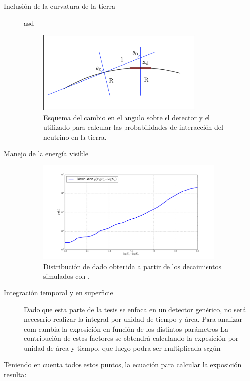 	\begin{description}
	 \item[Inclusi\'on de la curvatura de la tierra] asd
	 
	 \begin{figure}[ht!]
		\centering
		\includegraphics[width=0.8\textwidth]{./fig/appendix/curveEarthSketch.png}
		\caption{\label{fig:curveEarthSketch}
		Esquema del cambio en el angulo sobre el detector y el utilizado para calcular las probabilidades de interacci\'on del neutrino en la tierra.
		}
	\end{figure}
	 
	 \item[Manejo de la energ\'ia visible]
	 
	 \begin{figure}[h!]
		\begin{center}
			\includegraphics[width=0.9\textwidth]{fig/resultadosRadio/ev_etau}
			\caption{\label{fig:ev_etau} 
			Distribuci\'on de \ev{} dado \etau{} obtenida a partir de los decaimientos simulados con \tauola{}. 
			}
		\end{center}
	\end{figure}
	 
	 \item[Integraci\'on temporal y en superficie] Dado que esta parte de la tesis se enfoca en un detector gen\'erico, no ser\'a necesario realizar la integral por unidad de tiempo y \'area. 
	 Para analizar com cambia la exposici\'on en funci\'on de los distintos par\'ametros
	 La contribuci\'on de estos factores se obtendr\'a calculando la exposici\'on por unidad de \'area y tiempo, que luego podra ser multiplicada seg\'un 
	\end{description}
	Teniendo en cuenta todos estos puntos, la ecuaci\'on para calcular la exposici\'on resulta:
	

